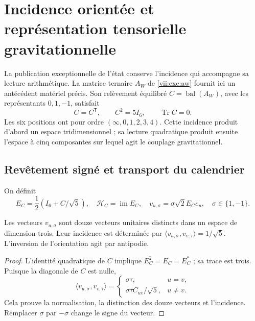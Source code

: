\section{Incidence orientée et représentation tensorielle gravitationnelle}
\label{vii:vii:sec:pentacomponente}
La publication exceptionnelle de l'état conserve l'incidence qui accompagne
sa lecture arithmétique. La matrice ternaire \(A_W\) de
\eqref{vii:exc:aw} fournit ici un antécédent matériel précis. Son
relèvement équilibré \(C=\operatorname{bal}(A_W)\), avec les représentants
\(0,1,-1\), satisfait
\[
 C=C^{\mathsf T},\qquad C^2=5I_6,\qquad \operatorname{Tr}C=0.
\]
Les six positions ont pour ordre \((\infty,0,1,2,3,4)\). Cette incidence produit d'abord un espace tridimensionnel ; sa lecture quadratique produit ensuite l'espace à cinq composantes sur lequel agit le couplage gravitationnel.

\subsection{Revêtement signé et transport du calendrier}
On définit
\[
 E_C=\frac12(I_6+C/\sqrt5),\quad
 \mathcal H_C=\operatorname{im}E_C,\quad
 v_{u,\sigma}=\sigma\sqrt2E_Ce_u,\quad \sigma\in\{1,-1\}.
\]
\begin{proposition}
\label{vii:vii:prop:doce-orientadas}
Les vecteurs \(v_{u,\sigma}\) sont douze vecteurs unitaires distincts
dans un espace de dimension trois. Leur incidence est déterminée par
\(\langle v_{u,\sigma},v_{v,\tau}\rangle=1/\sqrt5\).
L'inversion de l'orientation agit par antipodie.
\end{proposition}
\begin{proof}
L'identité quadratique de \(C\) implique \(E_C^2=E_C=E_C^*\) ; sa trace est trois. Puisque la diagonale de \(C\) est nulle,
\[
 \langle v_{u,\sigma},v_{v,\tau}\rangle
 =\begin{cases}\sigma\tau,&u=v,\\
 \sigma\tau C_{uv}/\sqrt5,&u\ne v.
 \end{cases}
\]
Cela prouve la normalisation, la distinction des douze vecteurs et l'incidence.
Remplacer \(\sigma\) par \(-\sigma\) change le signe du vecteur.
\end{proof}

